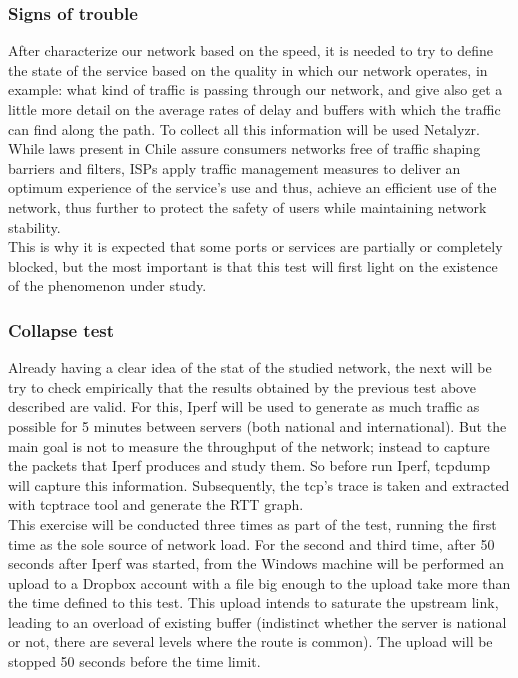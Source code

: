 \subsubsection{Signs of trouble} 
After characterize our network based on the
speed, it is needed to try to define the state of the service based on the
quality in which our network operates, in example: what kind of traffic is
passing through our network, and give also get a little more detail on the
average rates of delay and buffers with which the traffic can find along the
path. To collect all this information will be used Netalyzr. \\

While laws present in Chile assure consumers networks free of traffic shaping
barriers and filters, ISPs apply traffic management
measures\cite{shapevtr}\cite{shapemov} to deliver an optimum experience of the
service's use and thus, achieve an efficient use of the network, thus further to
protect the safety of users while maintaining network stability.\\

This is why it is expected that some ports or services are partially or
completely blocked, but the most important is that this test will first light on
the existence of the phenomenon under study.\\

\subsubsection{Collapse test} 
Already having a clear idea of the stat of the studied network, the next will be
try to check empirically that the results obtained by the previous test above
described are valid. For this, Iperf will be used to generate as much traffic as
possible for 5 minutes between servers (both national and international). But
the main goal is not to measure the throughput of the network; instead to
capture the packets that Iperf produces and study them. So before run Iperf,
tcpdump will capture this information. Subsequently, the tcp's trace is taken
and extracted with tcptrace tool and generate the RTT graph.\\

This exercise will be conducted three times as part of the test, running the
first time as the sole source of network load. For the second and third time,
after 50 seconds after Iperf was started, from the Windows machine will be 
performed an upload to a Dropbox account with a file big enough to the upload 
take more than the time defined to this test. This upload intends to saturate 
the upstream link, leading to an overload of existing buffer (indistinct 
whether the server is national or not, there are several levels where the 
route is common). The upload will be stopped 50 seconds before the time limit.\\

